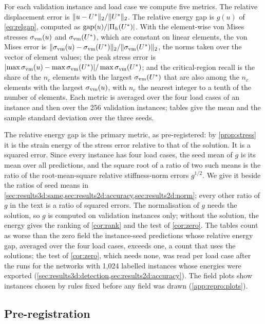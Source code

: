 For each validation instance and load case we compute five metrics. The relative
displacement error is $\lVert u-U^{\ast}\rVert_2/\lVert U^{\ast}\rVert_2$. The relative energy gap is
$g(u)$ of \eqref{eq:relgap}, computed as $\operatorname{gap}(u)/\lvert\Pi_h(U^{\ast})\rvert$. With the
element-wise von Mises stresses $\sigma_{\mathrm{vm}}(u)$ and $\sigma_{\mathrm{vm}}(U^{\ast})$, which are constant on linear
elements, the von Mises error is
$\lVert \sigma_{\mathrm{vm}}(u)-\sigma_{\mathrm{vm}}(U^{\ast})\rVert_2/\lVert \sigma_{\mathrm{vm}}(U^{\ast})\rVert_2$, the norms taken over the vector of
element values; the peak stress error is
$\lvert\max\sigma_{\mathrm{vm}}(u)-\max\sigma_{\mathrm{vm}}(U^{\ast})\rvert/\max\sigma_{\mathrm{vm}}(U^{\ast})$; and the critical-region recall is
the share of the $n_c$ elements with the largest $\sigma_{\mathrm{vm}}(U^{\ast})$ that are also among the
$n_c$ elements with the largest $\sigma_{\mathrm{vm}}(u)$, with $n_c$ the nearest integer to a tenth of the
number of elements. Each metric is averaged over the four load cases of an instance and
then over the 256 validation instances; tables give the mean and the sample standard
deviation over the three seeds.

The relative energy gap is the primary metric, as pre-registered: by \cref{prop:stress} it
is the strain energy of the stress error relative to that of the solution. It is a squared
error. Since every instance has four load cases, the seed mean of $g$ is its mean over all
predictions, and the square root of a ratio of two such means is the ratio of the
root-mean-square relative stiffness-norm errors $g^{1/2}$. We give it beside the ratios of
seed means in \cref{sec:results3d:same,sec:results2d:accuracy,sec:results2d:norm}; every
other ratio of $g$ in the text is a ratio of squared errors. The normalisation of $g$ needs
the solution, so $g$ is computed on validation
instances only; without the solution, the energy gives the ranking of \cref{cor:rank} and
the test of \cref{cor:zero}. The tables count as worse than the zero field the instance-seed
predictions whose relative energy gap, averaged over the four load cases, exceeds one, a
count that uses the solutions; the test of \cref{cor:zero}, which needs none, was read per
load case after the runs for the networks with 1,024 labelled instances whose energies were
exported (\cref{sec:results3d:detection,sec:results2d:accuracy}). The field plots show instances
chosen by rules fixed before any field was drawn (\ref{app:repro:plots}).

\subsection{Pre-registration}\label{sec:methods:prereg}

